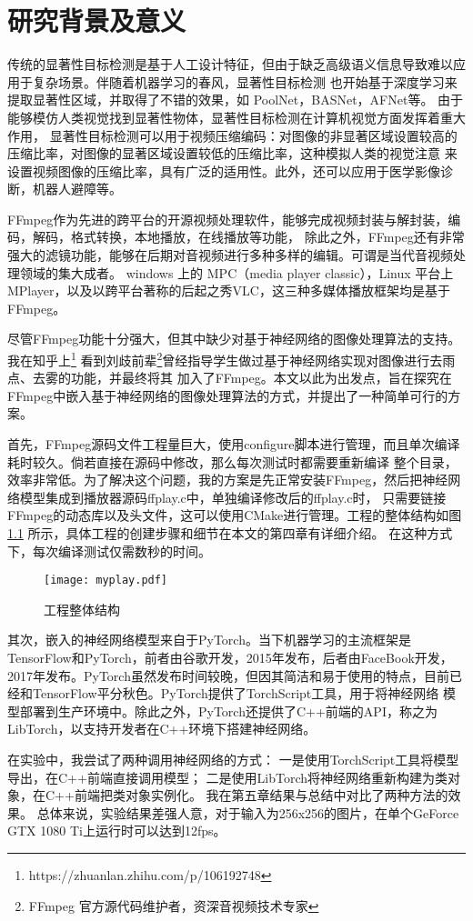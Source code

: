 
\chapter{研究背景及意义}

传统的显著性目标检测是基于人工设计特征，但由于缺乏高级语义信息导致难以应用于复杂场景。伴随着机器学习的春风，显著性目标检测
也开始基于深度学习来提取显著性区域，并取得了不错的效果，如 PoolNet\cite{PoolNet}，BASNet\cite{BASNet}，AFNet\cite{AFNet}等。
由于能够模仿人类视觉找到显著性物体，显著性目标检测在计算机视觉方面发挥着重大作用，
显著性目标检测可以用于视频压缩编码：对图像的非显著区域设置较高的压缩比率，对图像的显著区域设置较低的压缩比率，这种模拟人类的视觉注意
来设置视频图像的压缩比率，具有广泛的适用性。此外，还可以应用于医学影像诊断，机器人避障等。

FFmpeg作为先进的跨平台的开源视频处理软件，能够完成视频封装与解封装，编码，解码，格式转换，本地播放，在线播放等功能，
除此之外，FFmpeg还有非常强大的滤镜功能，能够在后期对音视频进行多种多样的编辑。可谓是当代音视频处理领域的集大成者。
windows 上的 MPC（media player classic），Linux 平台上 MPlayer，以及以跨平台著称的后起之秀VLC，这三种多媒体播放框架均是基于FFmpeg。

尽管FFmpeg功能十分强大，但其中缺少对基于神经网络的图像处理算法的支持。我在知乎上\footnote{https://zhuanlan.zhihu.com/p/106192748}
看到刘歧前辈\footnote{FFmpeg 官方源代码维护者，资深音视频技术专家}曾经指导学生做过基于神经网络实现对图像进行去雨点、去雾的功能，并最终将其
加入了FFmpeg。本文以此为出发点，旨在探究在FFmpeg中嵌入基于神经网络的图像处理算法的方式，并提出了一种简单可行的方案。

首先，FFmpeg源码文件工程量巨大，使用configure脚本进行管理，而且单次编译耗时较久。倘若直接在源码中修改，那么每次测试时都需要重新编译
整个目录，效率非常低。为了解决这个问题，我的方案是先正常安装FFmpeg，然后把神经网络模型集成到播放器源码ffplay.c中，单独编译修改后的ffplay.c时，
只需要链接FFmpeg的动态库以及头文件，这可以使用CMake进行管理。工程的整体结构如图 \ref{fig:myplay} 所示，具体工程的创建步骤和细节在本文的第四章有详细介绍。
在这种方式下，每次编译测试仅需数秒的时间。

\begin{figure}[h]
\centering
\texttt{[image: myplay.pdf]}
\caption{工程整体结构}
\label{fig:myplay}
\end{figure}

其次，嵌入的神经网络模型来自于PyTorch。当下机器学习的主流框架是TensorFlow和PyTorch，前者由谷歌开发，2015年发布，后者由FaceBook开发，
2017年发布。PyTorch虽然发布时间较晚，但因其简洁和易于使用的特点，目前已经和TensorFlow平分秋色。PyTorch提供了TorchScript工具，用于将神经网络
模型部署到生产环境中。除此之外，PyTorch还提供了C++前端的API，称之为LibTorch，以支持开发者在C++环境下搭建神经网络。

在实验中，我尝试了两种调用神经网络的方式：
一是使用TorchScript工具将模型导出，在C++前端直接调用模型；
二是使用LibTorch将神经网络重新构建为类对象，在C++前端把类对象实例化。
我在第五章结果与总结中对比了两种方法的效果。
总体来说，实验结果差强人意，对于输入为256x256的图片，在单个GeForce GTX 1080 Ti上运行时可以达到12fps。
